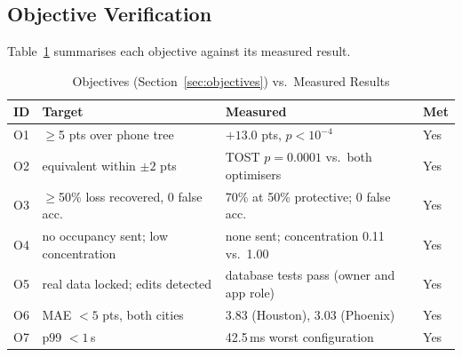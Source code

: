 \subsection{Objective Verification}
Table~\ref{tab:objectives} summarises each objective against its measured result.

\begin{table}[!t]
\centering
\caption{Objectives (Section~\ref{sec:objectives}) vs.\ Measured Results}
\label{tab:objectives}
\scriptsize
\setlength{\tabcolsep}{2.5pt}
\begin{tabular}{@{}p{0.45cm}p{2.6cm}p{3.6cm}p{0.6cm}@{}}
\toprule
ID & Target & Measured & Met \\
\midrule
O1 & $\ge$5 pts over phone tree & $+13.0$ pts, $p<10^{-4}$ & Yes \\
O2 & equivalent within $\pm2$ pts & TOST $p=0.0001$ vs.\ both optimisers & Yes \\
O3 & $\ge$50\% loss recovered, 0 false acc. & 70\% at 50\% protective; 0 false acc. & Yes \\
O4 & no occupancy sent; low concentration & none sent; concentration 0.11 vs.\ 1.00 & Yes \\
O5 & real data locked; edits detected & database tests pass (owner and app role) & Yes \\
O6 & MAE $<5$ pts, both cities & 3.83 (Houston), 3.03 (Phoenix) & Yes \\
O7 & p99 $<1$\,s & 42.5\,ms worst configuration & Yes \\
\bottomrule
\end{tabular}
\end{table}
